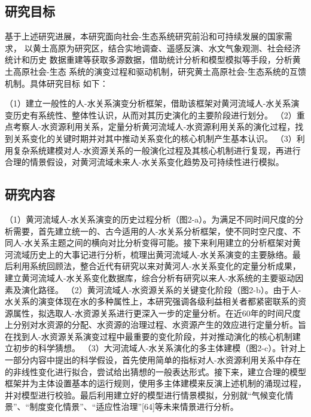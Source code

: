 
\subsection{研究目标}
基于上述研究进展，本研究面向社会-生态系统研究前沿和可持续发展的国家需求， 以黄土高原为研究区，结合实地调查、遥感反演、水文气象观测、社会经济统计和历史 数据重建等获取多源数据，借助统计分析和模型模拟等手段，分析黄土高原社会-生态 系统的演变过程和驱动机制，研究黄土高原社会-生态系统的互馈机制。具体研究目标 如下：

（1）建立一般性的人-水关系演变分析框架，借助该框架对黄河流域人-水关系演变历史有系统性、整体性认识，从而对其历史演化的主要阶段进行划分。
（2）重点考察人-水资源利用关系，定量分析黄河流域人-水资源利用关系的演化过程，找到关系变化的关键时期并对其中推动关系变化的核心机制产生基本认识。
（3）利用复杂系统建模对人-水资源关系的一般演化过程及其核心机制进行复现，再进行合理的情景假设，对黄河流域未来人-水关系变化趋势及可持续性进行模拟。

\subsection{研究内容}

（1）黄河流域人-水关系演变的历史过程分析（图2-a）。为满足不同时间尺度的分析需要，首先建立统一的、古今适用的人-水关系分析框架，使不同时空尺度、不同人-水关系主题之间的横向对比分析变得可能。接下来利用建立的分析框架对黄河流域历史上的大事记进行分析，梳理出黄河流域人-水关系演变的主要脉络。最后利用系统回顾法，整合近代有研究以来对黄河人-水关系变化的定量分析成果，建立黄河流域人-水关系变化数据库，综合分析有研究以来人-水系统的主要驱动因素及演化路径。 
（2）黄河流域人-水资源关系的关键变化阶段（图2-b）。由于人-水关系的演变体现在水的多种属性上，本研究强调各级利益相关者都紧密联系的资源属性，拟选取人-水资源关系进行更深入一步的定量分析。在近60年的时间尺度上分别对水资源的分配、水资源的治理过程、水资源产生的效应进行定量分析。旨在找到人-水资源关系演变过程中最重要的变化阶段，并对推动演化的核心机制建立初步的科学猜想。
（3）大河流域人-水关系演化的多主体建模（图2-c）。针对上一部分内容中提出的科学假设，首先使用简单的指标对人-水资源利用关系中存在的非线性变化进行拟合，尝试给出猜想的一般表达形式。接下来，建立合理的模型框架并为主体设置基本的运行规则，使用多主体建模来反演上述机制的涌现过程，并对模型进行校验。最后利用建立好的模型进行情景模拟，分别就“气候变化情景”、“制度变化情景”、“适应性治理”[64]等未来情景进行分析。

